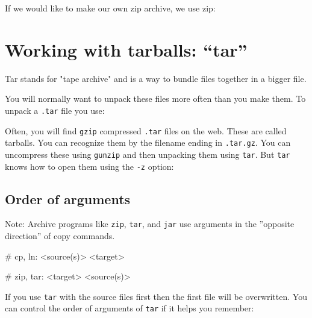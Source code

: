 If we would like to make our own zip archive, we use zip:

\begin{prompt}
\end{prompt}

\section{Working with tarballs: ``tar''}

Tar stands for "tape archive" and is a way to bundle files together in a bigger
file.

You will normally want to unpack these files more often than you make them. To
unpack a \verb|.tar| file you use:

\begin{prompt}
\end{prompt}

Often, you will find \verb|gzip| compressed \verb|.tar| files on the web. These are called
tarballs. You can recognize them by the filename ending in \verb|.tar.gz|.
 You can uncompress these using \verb|gunzip| and then unpacking them using
\verb|tar|. But \verb|tar| knows how to open them using the \verb|-z| option:

\begin{prompt}
\end{prompt}

\subsection{Order of arguments}

Note: Archive programs like \verb|zip|, \verb|tar|, and \verb|jar| use arguments in the
''opposite direction'' of copy commands.

\begin{prompt}
    # cp, ln: <source(s)> <target>

    # zip, tar: <target> <source(s)>
\end{prompt}

If you use \verb|tar| with the source files first then the first file will be
overwritten. You can control the order of arguments of \verb|tar| if it helps you
remember:

